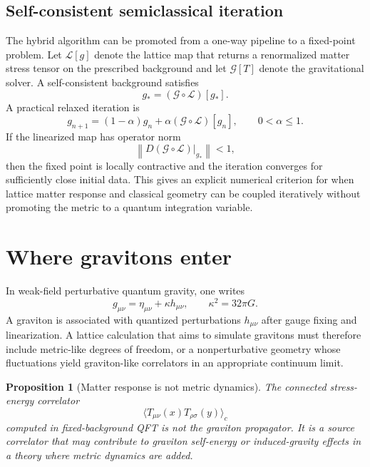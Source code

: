 \documentclass[11pt]{article}
\newtheorem{proposition}{Proposition}
\theoremstyle{remark}
\begin{document}
\subsection{Self-consistent semiclassical iteration}
The hybrid algorithm can be promoted from a one-way pipeline to a fixed-point problem. Let $\mathcal L[g]$ denote the lattice map that returns a renormalized matter stress tensor on the prescribed background and let $\mathcal G[T]$ denote the gravitational solver. A self-consistent background satisfies
\begin{equation}
 g_*=(\mathcal G\circ\mathcal L)[g_*].
 \label{eq:lqcd-fixedpoint}
\end{equation}
A practical relaxed iteration is
\begin{equation}
 g_{n+1}=(1-\alpha)g_n+\alpha(\mathcal G\circ\mathcal L)[g_n],
 \qquad 0<\alpha\le1.
 \label{eq:lqcd-relaxation}
\end{equation}
If the linearized map has operator norm
\begin{equation}
 \left\|D(\mathcal G\circ\mathcal L)\big|_{g_*}\right\|<1,
\end{equation}
then the fixed point is locally contractive and the iteration converges for sufficiently close initial data. This gives an explicit numerical criterion for when lattice matter response and classical geometry can be coupled iteratively without promoting the metric to a quantum integration variable.


\section{Where gravitons enter}

In weak-field perturbative quantum gravity, one writes
\begin{equation}
g_{\mu\nu}=\eta_{\mu\nu}+\kappa h_{\mu\nu},
\qquad \kappa^2=32\pi G.
\end{equation}
A graviton is associated with quantized perturbations $h_{\mu\nu}$ after gauge fixing and linearization. A lattice calculation that aims to simulate gravitons must therefore include metric-like degrees of freedom, or a nonperturbative geometry whose fluctuations yield graviton-like correlators in an appropriate continuum limit.

\begin{proposition}[Matter response is not metric dynamics]
The connected stress-energy correlator
\begin{equation}
\langle T_{\mu\nu}(x)T_{\rho\sigma}(y)\rangle_c
\end{equation}
computed in fixed-background QFT is not the graviton propagator. It is a source correlator that may contribute to graviton self-energy or induced-gravity effects in a theory where metric dynamics are added.
\end{proposition}
\end{document}
